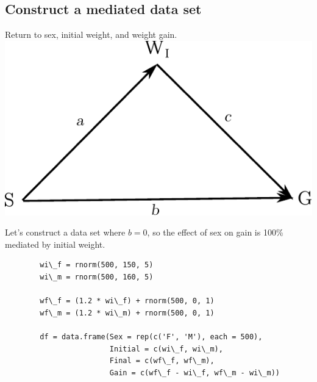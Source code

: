 \documentclass[xcolor=dvipsnames]{beamer}
\begin{document}
\subsection{Construct a mediated data set}
\begin{frame}{}
	Return to sex, initial weight, and weight gain.
	\includegraphics{arrow_diag.pdf}

	Let's construct a data set where $b = 0$, so the effect of sex on gain is
	100\% mediated by initial weight.
\end{frame}

\begin{frame}{}
	\begin{lstlisting}
		wi\_f = rnorm(500, 150, 5)
		wi\_m = rnorm(500, 160, 5)

		wf\_f = (1.2 * wi\_f) + rnorm(500, 0, 1)
		wf\_m = (1.2 * wi\_m) + rnorm(500, 0, 1)

		df = data.frame(Sex = rep(c('F', 'M'), each = 500),
						Initial = c(wi\_f, wi\_m),
						Final = c(wf\_f, wf\_m),
						Gain = c(wf\_f - wi\_f, wf\_m - wi\_m))
	\end{lstlisting}
\end{frame} 
\end{document}
